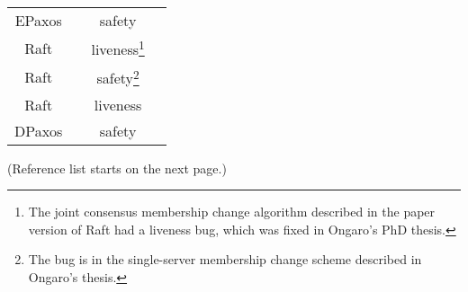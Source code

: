 \documentclass{article}
\begin{document}
\begin{center}
\begin{tabular}{ c c c c }
    EPaxos & \cite{moraruThereMoreConsensus2013} & safety &
    \cite{sutraCorrectnessEgalitarianPaxos2020} \\

    Raft & \cite{ongaroSearchUnderstandableConsensus2014} &
    liveness\footnote{The joint consensus membership change algorithm described
    in the paper version of Raft had a liveness bug, which was fixed in
    Ongaro's PhD thesis.} & \cite{hochConfigurationChanges2014} \\

    Raft & \cite{ongaroConsensusBridgingTheory2014} & safety\footnote{The bug
    is in the single-server membership change scheme described in Ongaro's
    thesis.} & \cite{amos15812TermPaper2015,
    ongaroBugSingleserverMembership2015} \\

    Raft & \cite{ongaroSearchUnderstandableConsensus2014,
    ongaroConsensusBridgingTheory2014} & liveness &
    \cite{howardRaftDoesNot2020} \\

    DPaxos & \cite{nawabDPaxosManagingData2018} & safety &
    \cite{whittakerMatchmakerPaxosReconfigurable2021} \\

    \bottomrule
\end{tabular}
\end{center}

\vspace*{\fill}
\begin{center}
(Reference list starts on the next page.)
\end{center}
\vspace*{\fill}

\newpage
\printbibliography
\end{document}
